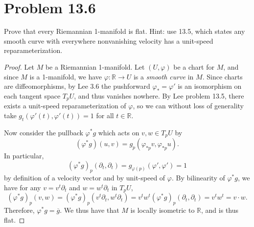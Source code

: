 \documentclass[11pt, letterpaper]{article}
\begin{document}
\section{Problem 13.6}
\begin{problem}
	Prove that every Riemannian 1-manifold is flat. Hint: use 13.5, which states any smooth curve with everywhere nonvanishing velocity has a unit-speed reparameterization.
\end{problem}
\begin{proof}
	Let $M$ be a Riemannian 1-manifold. Let $(U,\varphi )$ be a chart for $M$, and since $M$ is a 1-manifold, we have $\varphi : \mathbb{R}  \to U$ is a \emph{smooth curve} in $M$. Since charts are diffeomorphisms, by Lee 3.6 the pushforward $\varphi_* = \varphi '$ is an isomorphism on each tangent space $T_pU$, and thus vanishes nowhere. By Lee problem 13.5, there exists a unit-speed reparameterization of $\varphi $, so we can without loss of generality take $g_t(\varphi '(t),\varphi'(t))=1$ for all $t\in\mathbb{R} $.

	Now consider the pullback $\varphi ^*g$ which acts on $v,w\in T_pU$ by
	\[
		(\varphi ^*g)(u,v) = g_p(\varphi _{*p} v,\varphi _{*p} u)
	.\]
	In particular,
	\[
		(\varphi ^*g)_p(\partial _t,\partial _t) = g_{\varphi (p)}(\varphi ',\varphi ')=1
	\]
	by definition of a velocity vector and by unit-speed of $\varphi $. By bilinearity of $\varphi ^*g$, we have for any $v=v^t \partial _t$ and $w=w^t \partial _t$ in $T_pU$,
	\[
		(\varphi ^*g)_p(v,w) = (\varphi ^*g)_p(v^t \partial _t,w^t \partial _t) = v^tw^t (\varphi ^*g)_p(\partial _t,\partial _t) = v^t w^t = v\cdot w
	.\]
	Therefore, $\varphi ^*g = \overline{g} $. We thus have that $M$ is locally isometric to $\mathbb{R} $, and is thus flat.
\end{proof}
\end{document}
